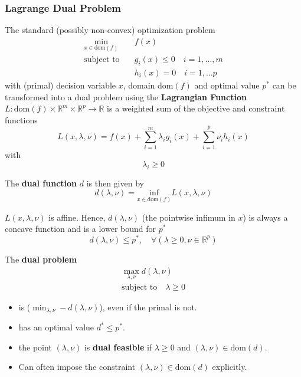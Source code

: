 \subsubsection{Lagrange Dual Problem}

The standard (possibly non-convex) optimization problem
\begin{align*}
    \min_{x\in\text{dom}(f)} & f(x)                                \\
    \text{subject to}\quad   & g_i(x)\leq 0 \quad i = 1, \ldots, m \\
                             & h_i(x) = 0 \quad i = 1, \ldots  p
\end{align*}
with (primal) decision variable $x$, domain dom$(f)$ and optimal value $p^*$ can be transformed into a dual problem using the \textbf{Lagrangian Function} $L: \mathrm{dom}\left(f\right)\times\mathbb{R}^m\times\mathbb{R}^p\to\mathbb{R}$ is a weighted sum of the objective and constraint functions
\begin{equation*}
    L(x,\lambda,\nu)=f(x)+\sum_{i=1}^{m}\lambda_i g_i(x) + \sum_{i=1}^{p}\nu_i h_i(x)
\end{equation*}
with
\begin{equation*}
    \lambda_i \geq 0
\end{equation*}

The \textbf{dual function} $d$ is then given by
\begin{equation*}
    d(\lambda, \nu) = \underset{x\in\text{dom}(f)}{\text{inf}} L(x,\lambda,\nu)
\end{equation*}

$L(x,\lambda,\nu)$ is affine. Hence, $d(\lambda, \nu)$ (the pointwise infimum in $x$) is always a concave function and is a lower bound for $p^*$
\begin{equation*}
    d(\lambda,\nu)\leq p^*, \quad \forall(\lambda \geq 0, \nu \in \mathbb{R}^p)
\end{equation*}

The \textbf{dual problem}
\begin{gather*}
    \max_{\lambda,\nu} d(\lambda, \nu) \\
    \text{subject to}\quad \lambda \geq 0
\end{gather*}
\begin{itemize}
    \item is  ($\min_{\lambda,\nu} -d(\lambda, \nu) $), even if the primal is not. %
    \item has an optimal value $d^* \leq p^*$.
    \item the point $(\lambda,\nu)$ is \textbf{dual feasible} if $\lambda \geq 0$ and $(\lambda, \nu) \in \text{dom}(d)$.
    \item Can often impose the constraint $(\lambda, \nu)\in \mathrm{dom}(d)$ explicitly. %
\end{itemize}


